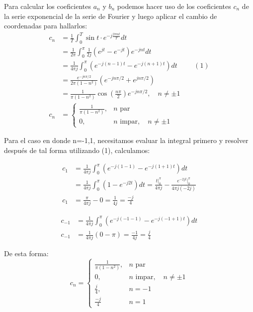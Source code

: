 \documentclass[12pt,a4paper]{report}
\begin{document}
\begin{enumerate}[label=\alph*),left=0pt]
\begin{itemize}[left=0pt]
Para calcular los coeficientes $a_n$ y $b_n$ podemos hacer uso de los coeficientes $c_n$ de la serie exponencial de la serie de Fourier y luego aplicar el cambio de coordenadas para hallarlos:
            $$
            \begin{aligned}
            c_n &= \frac{1}{T} \int_0^T \sin t \cdot e^{-j\frac{2\pi n t}{T}} dt\\
                &= \frac{1}{2\pi} \int_0^{\pi} \frac{1}{2j}\left(e^{jt} - e^{-jt}\right) e^{-jnt} dt\\
                &= \frac{1}{4\pi j} \int_0^{\pi} \left(e^{-j(n-1)t} - e^{-j(n+1)t}\right) dt \hspace{1cm}(1)\\
                &= \frac{e^{-jn\pi/2}}{2\pi(1-n^2)} \left(e^{-jn\pi/2} + e^{jn\pi/2}\right)\\
                & = \frac{1}{\pi(1-n^2)} \cos\left(\frac{n\pi}{2}\right)e^{-jn\pi/2}, \quad n \neq \pm 1\\
                c_n &= \begin{cases}
            \frac{1}{\pi(1-n^2)}, & n \text{ par} \\[5pt]
            0, & n \text{ impar}, \quad n \neq \pm 1
            \end{cases}
            \end{aligned}
            $$

       Para el caso en donde n=-1,1, necesitamos evaluar la integral primero y resolver después de tal forma utilizando (1), calculamos:

       $$
       \begin{aligned}
       c_1&=\frac{1}{4\pi j}\int_0^\pi(e^{-j(1-1)}-e^{-j(1+1)t})dt\\
       &=\frac{1}{4\pi j}\int^\pi_0 (1-e^{-j2t})dt=\frac{t|^\pi_0}{4\pi j}-\frac{e^{-2jt}|^\pi_0}{4\pi j (-2j)}\\
       c_1&=\frac{\pi}{4\pi j}-0=\frac{1}{4j}=\frac{-j}{4}
       \end{aligned}
       $$
     
       $$
        \begin{aligned}
        c_{-1}&=\frac{1}{4\pi j}\int^\pi_0(e^{-j(-1-1)}-e^{-j(-1+1)t})dt\\
       c_{-1}&=\frac{1}{4\pi j}(0-\pi)=\frac{-1}{4j}=\frac{j}{4}     
        \end{aligned}
       $$

       De esta forma:
       $$
       c_n = \begin{cases}
            \frac{1}{\pi(1-n^2)}, & n \text{  par} \\[5pt]
            0, & n \text{  impar}, \quad n \neq \pm 1 \\
            \frac{j}{4}, & n=-1 \\
            \frac{-j}{4} & n=1
            \end{cases}$$


\end{itemize}
\end{enumerate}
\end{document}
